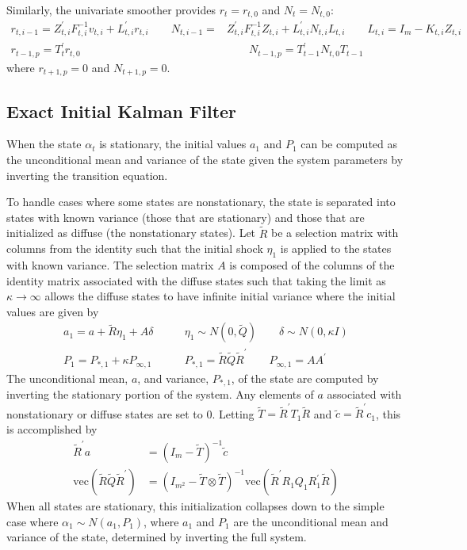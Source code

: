 \documentclass[12pt]{article}
\newcommand{\vecop}[0]{\text{vec}}
\begin{document}
	Similarly, the univariate smoother provides $r_t = r_{t,0}$ and $N_t = N_{t,0}$:
	\begin{align*}
	r_{t,i-1} = Z_{t,i}^\prime F_{t,i}^{-1} v_{t,i} + L_{t,i}^{\prime} r_{t,i} \qquad 
	N_{t,i-1} =& Z_{t,i}^\prime F_{t,i}^{-1} Z_{t,i} + L_{t,i}^{\prime} N_{t,i} L_{t,i} \qquad 
	L_{t,i} = I_m - K_{t,i} Z_{t,i} \\
	r_{t-1,p} = T_{t}^\prime r_{t,0} &\qquad 
	N_{t-1,p} = T_{t-1}^\prime N_{t,0} T_{t-1}
	\end{align*}
	where $r_{t+1,p} = 0$ and $N_{t+1,p} = 0$. 

\subsection{Exact Initial Kalman Filter}
	When the state $\alpha_t$ is stationary, the initial values $a_1$ and $P_1$ can be computed as the unconditional mean and variance of the state given the system parameters by inverting the transition equation. 

	To handle cases where some states are nonstationary, the state is separated into states with known variance (those that are stationary) and those that are initialized as diffuse (the nonstationary states). Let $\tilde{R}$ be a selection matrix with columns from the identity such that the initial shock $\eta_1$ is applied to the states with known variance. The selection matrix $A$ is composed of the columns of the identity matrix associated with the diffuse states such that taking the limit as $\kappa \rightarrow \infty$ allows the diffuse states to have infinite initial variance where the initial values are given by 
	\begin{align*}
	a_1 = a + \tilde{R} \eta_1 + A \delta \qquad& \eta_1 \sim N(0, \tilde{Q}) \qquad \delta \sim N(0, \kappa I) \\
	P_1 = P_{*,1} + \kappa P_{\infty,1} \qquad& P_{*,1} = \tilde{R} \tilde{Q} \tilde{R}^\prime \qquad P_{\infty,1} = A A^\prime 
	\end{align*}
	The unconditional mean, $a$, and variance, $P_{*,1}$, of the state are computed by inverting the stationary portion of the system. Any elements of $a$ associated with nonstationary or diffuse states are set to 0. Letting $\tilde{T} = \tilde{R}^\prime T_1 \tilde{R}$ and $\tilde{c} = \tilde{R}^\prime c_1$, this is accomplished by
	\begin{align*}
	\tilde{R}^\prime a &= (I_m - \tilde{T})^{-1} \tilde{c} \\
	\vecop(\tilde{R} \tilde{Q} \tilde{R}^\prime) &= (I_{m^2} - \tilde{T} \otimes \tilde{T})^{-1} \vecop(\tilde{R}^\prime R_1 Q_1 R_1^\prime \tilde{R}) 
	\end{align*}
	When all states are stationary, this initialization collapses down to the simple case where $\alpha_1 \sim N(a_1, P_1)$, where $a_1$ and $P_1$ are the unconditional mean and variance of the state, determined by inverting the full system. 
\end{document}
